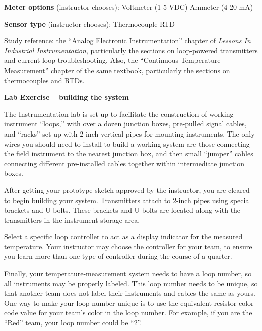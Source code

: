 \documentclass[12pt,a4paper]{article}
\begin{document}
\begin{itemize}
\vskip 10pt

\noindent
{\bf Meter options} (instructor chooses): \hskip 20pt \underbar{\hskip 20pt} Voltmeter (1-5 VDC) \hskip 20pt \underbar{\hskip 20pt} Ammeter (4-20 mA)

\vskip 10pt

\noindent
{\bf Sensor type} (instructor chooses): \hskip 20pt \underbar{\hskip 20pt} Thermocouple \hskip 20pt \underbar{\hskip 20pt} RTD

\vfil

Study reference: the ``Analog Electronic Instrumentation'' chapter of {\it Lessons In Industrial Instrumentation}, particularly the sections on loop-powered transmitters and current loop troubleshooting.  Also, the ``Continuous Temperature Measurement'' chapter of the same textbook, particularly the sections on thermocouples and RTDs.



\vfil \eject

\noindent
{\bf Lab Exercise -- building the system}

\vskip 5pt

The Instrumentation lab is set up to facilitate the construction of working instrument ``loops,'' with over a dozen junction boxes, pre-pulled signal cables, and ``racks'' set up with 2-inch vertical pipes for mounting instruments.  The only wires you should need to install to build a working system are those connecting the field instrument to the nearest junction box, and then small ``jumper'' cables connecting different pre-installed cables together within intermediate junction boxes.

After getting your prototype sketch approved by the instructor, you are cleared to begin building your system.  Transmitters attach to 2-inch pipes using special brackets and U-bolts.  These brackets and U-bolts are located along with the transmitters in the instrument storage area.  

Select a specific loop controller to act as a display indicator for the measured temperature.  Your instructor may choose the controller for your team, to ensure you learn more than one type of controller during the course of a quarter.

Finally, your temperature-measurement system needs to have a loop number, so all instruments may be properly labeled.  This loop number needs to be unique, so that another team does not label their instruments and cables the same as yours.  One way to make your loop number unique is to use the equivalent resistor color-code value for your team's color in the loop number.  For example, if you are the ``Red'' team, your loop number could be ``2''. 


\end{itemize}
\end{document}
